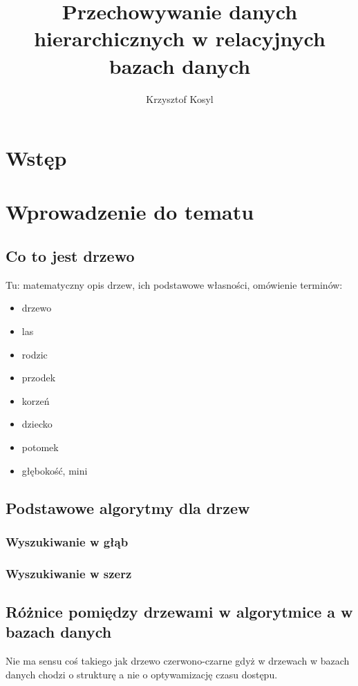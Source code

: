 \documentclass[10pt,a4paper,draft]{book}
\author{Krzysztof Kosyl}
\title{Przechowywanie danych hierarchicznych w relacyjnych bazach danych}
\begin{document}
\maketitle{}
\tableofcontents{}

\chapter{Wstęp}




\chapter{Wprowadzenie do tematu}

\section{Co to jest drzewo}

Tu: matematyczny opis drzew, ich podstawowe własności, omówienie terminów:
\begin{itemize}
 \item drzewo
 \item las
 \item rodzic
 \item przodek
 \item korzeń
 \item dziecko
 \item potomek
 \item głębokość, mini
\end{itemize}



\section{Podstawowe algorytmy dla drzew}
\subsection{Wyszukiwanie w głąb}
\subsection{Wyszukiwanie w szerz}


\section{Różnice pomiędzy drzewami w algorytmice a w bazach danych}

Nie ma sensu coś takiego jak drzewo czerwono-czarne gdyż w drzewach w bazach danych chodzi o strukturę a nie o optywamizację czasu dostępu.
\end{document}

